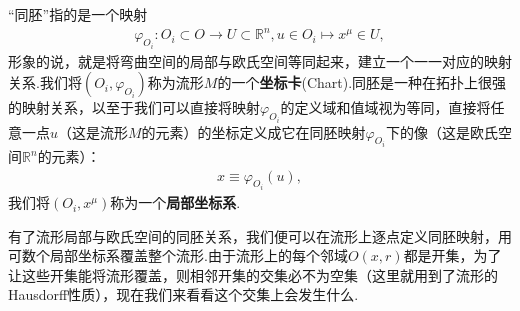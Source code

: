 	\begin{remark}
		“同胚”指的是一个映射
		\begin{equation}
			\begin{split}
				\varphi_{O_i}:O_i\subset O\rightarrow U\subset \mathbb{R}^n,u\in O_i\mapsto x^\mu\in U,
			\end{split}
		\end{equation}
		形象的说，就是将弯曲空间的局部与欧氏空间等同起来，建立一个一一对应的映射关系.我们将$(O_i,\varphi_{O_i})$称为流形$M$的一个\textbf{坐标卡}(Chart).同胚是一种在拓扑上很强的映射关系，以至于我们可以直接将映射$\varphi_{O_i}$的定义域和值域视为等同，直接将任意一点$u$（这是流形$M$的元素）的坐标定义成它在同胚映射$\varphi_{O_i}$下的像（这是欧氏空间$\mathbb{R}^n$的元素）：
		\begin{equation}
			\begin{split}
				x\equiv \varphi_{O_i}(u),
			\end{split}
		\end{equation}
		我们将$(O_i,x^\mu)$称为一个\textbf{局部坐标系}.
	\end{remark}
	有了流形局部与欧氏空间的同胚关系，我们便可以在流形上逐点定义同胚映射，用可数个局部坐标系覆盖整个流形.由于流形上的每个邻域$O(x,r)$都是开集，为了让这些开集能将流形覆盖，则相邻开集的交集必不为空集（这里就用到了流形的Hausdorff性质），现在我们来看看这个交集上会发生什么.
	
